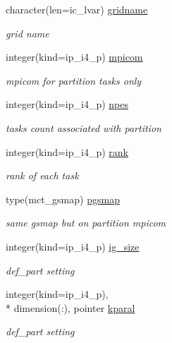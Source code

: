\begin{DoxyCompactItemize}
character(len=ic\+\_\+lvar) \hyperlink{structmod__oasis__part_1_1prism__part__type_a4507d4efc53b93149a44bf44d12c9e56}{gridname}
\begin{DoxyCompactList}\small\item\em grid name \end{DoxyCompactList}\item 
integer(kind=ip\+\_\+i4\+\_\+p) \hyperlink{structmod__oasis__part_1_1prism__part__type_a5aaf8efdc7391d2a64f269dd97055612}{mpicom}
\begin{DoxyCompactList}\small\item\em mpicom for partition tasks only \end{DoxyCompactList}\item 
integer(kind=ip\+\_\+i4\+\_\+p) \hyperlink{structmod__oasis__part_1_1prism__part__type_a3f129d8d5ee4ccf7b071febc1c3f37c3}{npes}
\begin{DoxyCompactList}\small\item\em tasks count associated with partition \end{DoxyCompactList}\item 
integer(kind=ip\+\_\+i4\+\_\+p) \hyperlink{structmod__oasis__part_1_1prism__part__type_a1bf56b7dcc55c07cab5d1be13d33cfdd}{rank}
\begin{DoxyCompactList}\small\item\em rank of each task \end{DoxyCompactList}\item 
type(mct\+\_\+gsmap) \hyperlink{structmod__oasis__part_1_1prism__part__type_ace66d3bf592452e56ffe202df3a09310}{pgsmap}
\begin{DoxyCompactList}\small\item\em same gsmap but on partition mpicom \end{DoxyCompactList}\item 
integer(kind=ip\+\_\+i4\+\_\+p) \hyperlink{structmod__oasis__part_1_1prism__part__type_a68188f6203fd3a54b307f3074cd01957}{ig\+\_\+size}
\begin{DoxyCompactList}\small\item\em def\+\_\+part setting \end{DoxyCompactList}\item 
integer(kind=ip\+\_\+i4\+\_\+p), \\*
dimension(\+:), pointer \hyperlink{structmod__oasis__part_1_1prism__part__type_a32de1a0439c69db4f6b4d42839ad4202}{kparal}
\begin{DoxyCompactList}\small\item\em def\+\_\+part setting \end{DoxyCompactList}\end{DoxyCompactItemize}


